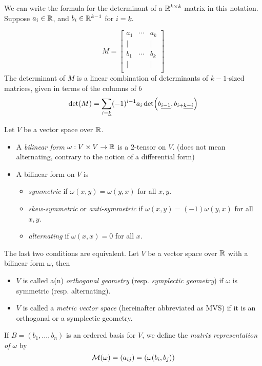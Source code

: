 \documentclass[../main-v2-manifolds.tex]{subfiles}
\begin{document}
\begin{remark}\label{rmk:preview of exterior calculus}
We can write the formula for the determinant of a $\mathbb{R}^{k\times k}$ matrix in this notation. Suppose $a_i\in\mathbb{R}$, and $b_i\in\mathbb{R}^{k-1}$ for $i=\underline{k}$.

\[
M = \begin{bmatrix}
    a_1 & \cdots & a_k \\[1ex]
    \vert &  & \vert \\
    b_1 & \cdots & b_k \\
    \vert &  & \vert \\[1ex]
\end{bmatrix}
\]
The determinant of $M$ is a linear combination of determinants of $k-1$-sized matrices, given in terms of the columns of $b$
\[
    \det(M) = \sum_{i=\underline{k}}(-1)^{i-1} a_i\det(\UL{b}[i-1],\UL{b}[i+][k-i])
\]    
\end{remark}
    
    Let $V$ be a vector space over $\mathbb{R}$. 
    \begin{itemize}
        \item A \emph{bilinear form} $\omega: V\times V\to \mathbb{R}$ is a $2$-tensor on $V$. (does not mean alternating, contrary to the notion of a differential form)
        \item A bilinear form on $V$ is 
        \begin{itemize}
            \item \emph{symmetric} if $\omega(x,y) = \omega(y,x)$ for all $x,y$.
            \item \emph{skew-symmetric} or \emph{anti-symmetric} if $\omega(x,y) = (-1)\omega(y,x)$ for all $x,y$.
            \item \emph{alternating} if $\omega(x,x)=0$ for all $x$.
        \end{itemize}
    \end{itemize}

    The last two conditions are equivalent. Let $V$ be a vector space over $\mathbb{R}$ with a bilinear form $\omega$, then 
        \begin{itemize}
            \item $V$ is called a(n) \emph{orthogonal geometry} (resp. \emph{symplectic geometry}) if $\omega$ is symmetric (resp. alternating). 
            \item $V$ is called a \emph{metric vector space} (hereinafter abbreviated as MVS) if it is an orthogonal or a symplectic geometry.
        \end{itemize}
    \begin{definition}
        If $B=(b_1,\ldots,b_n)$ is an ordered basis for $V$, we define the \emph{matrix representation of $\omega$} by
        \[
            \mathcal{M}(\omega) = (a_{ij}) = (\omega(b_i, b_j))
        \]
    \end{definition}
    
\end{document}
